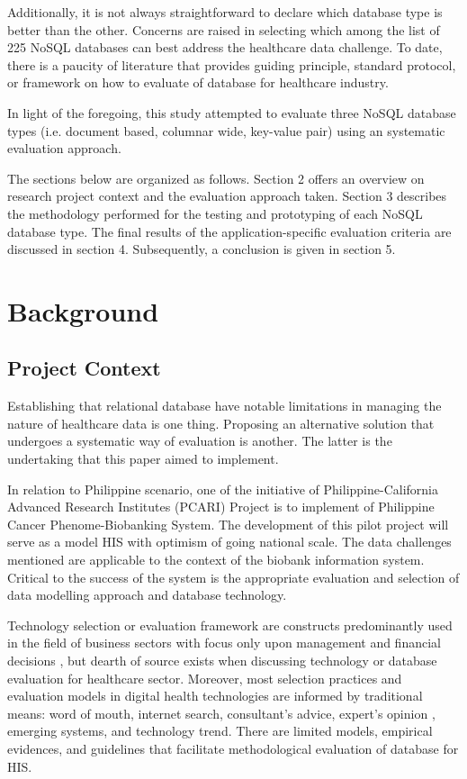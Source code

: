 \documentclass[5p]{elsarticle}
\begin{document}
Additionally, it is not always straightforward to declare which database type is better than the other. Concerns are raised in selecting which among the list of 225 NoSQL databases \cite{S.Edlich2018} 
can best address the healthcare data challenge. To date, there is a paucity of literature that provides guiding principle, standard protocol, or framework on how to
evaluate of database for healthcare industry.

In light of the foregoing, this study attempted to evaluate three NoSQL database types (i.e. document based, columnar wide, key-value pair) using an systematic evaluation approach. 

The sections below are organized as follows.
Section 2 offers an overview on research project context and the evaluation approach taken. 
Section 3 describes the methodology performed for the testing and prototyping of each NoSQL database type.
The final results of the application-specific evaluation criteria are discussed in section 4. 
Subsequently, a conclusion is given in section 5.

\section{Background}
\subsection{Project Context}
Establishing that relational database have notable limitations in managing the nature of healthcare data \cite{Z.Goli-Malekabadi201675,K.Lee201299,H.Al-Fatlawi2015122,O.Schmitt20121,Y.Jin2011288} is one thing. 
Proposing an alternative solution that undergoes a systematic way of evaluation is another. The latter is the undertaking that this paper aimed to implement.

In relation to Philippine scenario, one of the initiative of Philippine-California Advanced Research Institutes (PCARI) Project is to implement 
of Philippine Cancer Phenome-Biobanking System. The development of this pilot project will serve as a model HIS with optimism 
of going national scale. The data challenges mentioned are applicable to the context of the biobank information system. 
Critical to the success of the system is the appropriate evaluation and selection of data modelling approach and database technology.


Technology selection or evaluation framework are constructs predominantly used in the field of business sectors with focus only upon management and financial 
decisions \cite{C.Chan2010300}, but dearth of source exists when discussing technology or database evaluation for healthcare sector. Moreover, most selection 
practices and evaluation models in digital health technologies are informed by traditional means: word of mouth, internet search, consultant’s advice, expert’s opinion \cite{A.Ostrovsky20141}, 
emerging systems, and technology trend. There are limited models, empirical evidences, and guidelines that facilitate methodological evaluation of database for HIS. 
\end{document}
